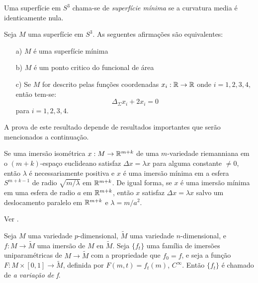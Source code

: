 \begin{definicao}
	Uma superfície em $S^3$ chama-se de \emph{superfície mínima} se a curvatura media é identicamente nula.
\end{definicao}

\begin{teorema}\label{propriedades_sup_min_S3}
	Seja $M$ uma superfície em $S^3$. As seguentes afirmações são equivalentes:
	\begin{enumerate}
		\item[a)] $M$ é uma superfície mínima
		\item[b)] $M$ é um ponto critico do funcional de área
		\item[c)] Se $M$ for descrito pelas funções coordenadas $x_i: \mathbb{R} \rightarrow \mathbb{R}$ onde $i=1,2,3,4$, então tem-se:
		\begin{equation*}
		\Delta_{\Sigma} x_i + 2 x_i = 0
		\end{equation*}
		para $i=1,2,3,4$.
	\end{enumerate}
\end{teorema}
A prova de este resultado depende de resultados importantes que serão mencionados a continuação.
\begin{teorema}\label{thm:takahashi}
	Se uma imersão isométrica $x: M \rightarrow \mathbb R^{m+k}$ de uma $m$-variedade riemanniana em o $(m+k)$-espaço euclideano satisfaz $ \Delta x = \lambda x $ para alguma constante $\neq 0$, então $\lambda$ é necessariamente positiva e $x$ é uma imersão mínima em a esfera $S^{m+k-1}$ de radio $\sqrt{m/\lambda}$ em $\mathbb R^{m+k}$. De igual forma, se $x$ é uma imersão mínima em uma esfera de radio $a$ em $\mathbb R^{m+k}$, então $x$ satisfaz $\Delta x = \lambda x$ salvo um deslocamento paralelo em $\mathbb R^{m+k}$ e $\lambda = m/a^2$.
\end{teorema}

\begin{demonstracao}
	Ver \cite[Theorem 3]{TAKAHASHI1966}.
\end{demonstracao}

\begin{definicao}
	Seja $M$ uma variedade $p$-dimensional, $\tilde{M}$ uma variedade $n$-dimensional, e $f: M \rightarrow \tilde{M}$ uma imersão de $M$ en $\tilde{M}$.
	Seja $\{ f_t \}$ uma família de imersões uniparamétricas de $M \rightarrow \tilde{M}$ com a propriedade que $f_0 = f$, e seja a função $F: M \times [0,1] \rightarrow \tilde{M}$, definida por $F(m,t) = f_t(m)$, $C^{\infty}$. Então $\{ f_t \}$ é chamado de \emph{a variação de f}.
\end{definicao}


